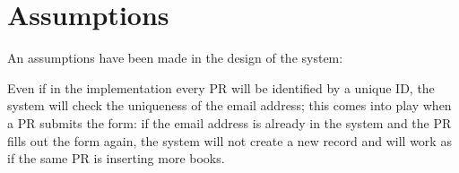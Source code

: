 \section{Assumptions}
\label{sec:assumptions}

An assumptions have been made in the design of the system:

Even if in the implementation every PR will be identified by a unique ID, the system will check the uniqueness of the email address; this comes into play when a PR submits the form: if the email address is already in the system and the PR fills out the form again, the system will not create a new record and will work as if the same PR is inserting more books.